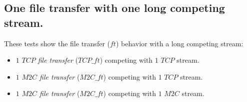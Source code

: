 \documentclass[a4paper]{article}
\begin{document}
    \subsection{One file transfer with one long competing stream.}
        These tests show the file transfer ($ft$) behavior with a long competing
        stream:
        \begin{itemize}
            \item{
                $1$ \textit{$TCP$ file transfer} ($TCP\_ft$) competing with
                    $1$ $TCP$ stream.
            }
            \item{
                $1$ \textit{$M2C$ file transfer} ($M2C\_ft$) competing with
                    $1$ $TCP$ stream.
            }
            \item{
                $1$ \textit{$M2C$ file transfer} ($M2C\_ft$) competing with
                    $1$ $M2C$ stream.
            }
        \end{itemize}
\end{document}
